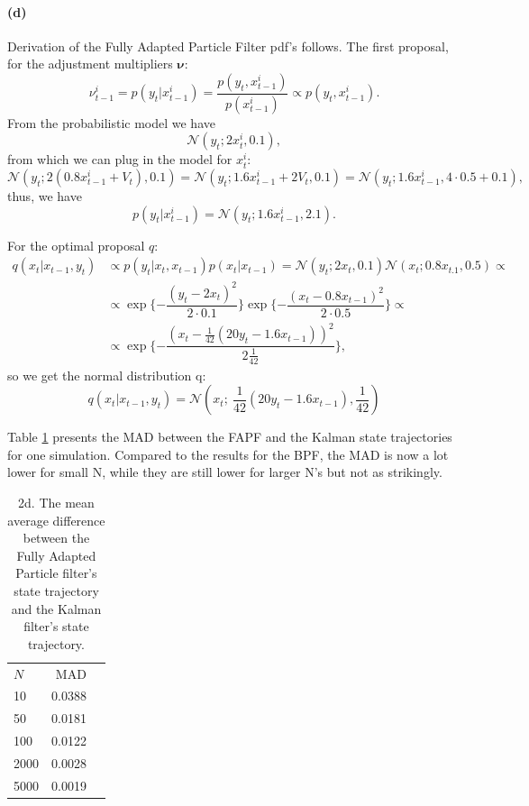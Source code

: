 \documentclass{article}
\begin{document}
\paragraph{(d)} Derivation of the Fully Adapted Particle Filter pdf's follows.
The first proposal, for the adjustment multipliers $\bm{\nu}$:
	\begin{equation}
		\nu_{t-1}^i = p(y_t|x_{t-1}^i) = \dfrac{p(y_t,x_{t-1}^i)}{p(x_{t-1}^i)} \propto p(y_t,x_{t-1}^i).
	\end{equation}
	From the probabilistic model we have 
	\begin{equation}
		\mathcal{N}(y_t; 2x_t^i,0.1),
	\end{equation}
	from which we can plug in the model for $x_t^i$:
	\begin{equation}
		\mathcal{N}(y_t; 2(0.8x_{t-1}^i+V_t),0.1) = \mathcal{N}(y_t; 1.6x_{t-1}^i + 2V_t,0.1) = \mathcal{N}(y_t; 1.6x_{t-1}^i,4\cdot 0.5 + 0.1),
	\end{equation}
	thus, we have 
	\begin{equation}
		p(y_t|x_{t-1}^i) = \mathcal{N}(y_t; 1.6x_{t-1}^i, 2.1).
	\end{equation}
	
For the optimal proposal $q$:
	\begin{align}
		q(x_t|x_{t-1}, y_t) &\propto p(y_t|x_t,x_{t-1})p(x_t|x_{t-1}) = \mathcal{N}(y_t;2x_t,0.1)\mathcal{N}(x_t; 0.8x_{t.1},0.5) \propto\\
		&\propto \exp\{-\dfrac{(y_t-2x_t)^2}{2\cdot 0.1}\}\exp\{-\dfrac{(x_t-0.8x_{t-1})^2}{2\cdot 0.5}\}\propto\\
		&\propto\exp\{-\dfrac{(x_t-\frac{1}{42}(20y_t-1.6x_{t-1}))^2}{2\frac{1}{42}}\},
	\end{align}
so we get the normal distribution q:
	\begin{equation}
		q(x_t|x_{t-1}, y_t) = \mathcal{N}(x_t;~\frac{1}{42}(20y_t-1.6x_{t-1}), \frac{1}{42})
	\end{equation}


Table \ref{tab:2d} presents the MAD between the FAPF and the Kalman state trajectories for one simulation. Compared to the results for the BPF, the MAD is now a lot lower for small N, while they are still lower for larger N's but not as strikingly. 
\begin{table}
	\centering
	\begin{tabular}{lrr}\hline
		$N$ & MAD 		\\
		10 	& 0.0388	\\
		50	& 0.0181	\\
		100	& 0.0122	\\
		2000& 0.0028	\\
		5000& 0.0019 	\\\hline
	\end{tabular}
	\caption{2d. The mean average difference between the Fully Adapted Particle filter's state trajectory and the Kalman filter's state trajectory.}
	\label{tab:2d}
\end{table}
\end{document}
